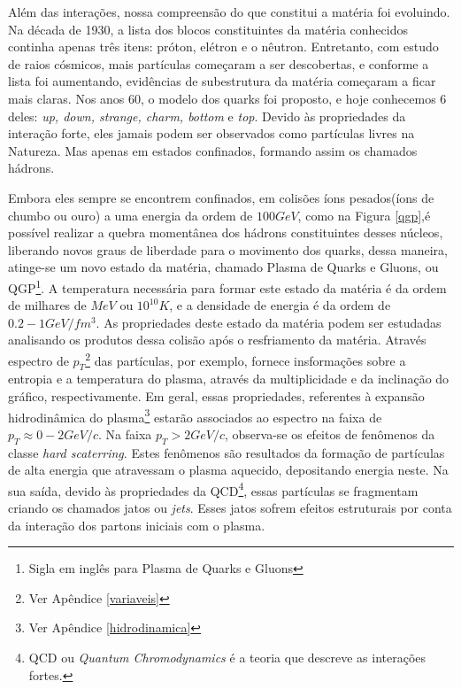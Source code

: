 Além das interações, nossa compreensão do que constitui a matéria foi evoluindo. Na década de 1930, a lista dos blocos
constituintes da matéria conhecidos continha apenas três itens: próton, elétron e o nêutron. Entretanto, com estudo de raios
cósmicos, mais partículas começaram a ser descobertas, e conforme a lista foi aumentando, evidências de subestrutura da matéria
começaram a ficar mais claras. Nos anos 60, o modelo dos quarks foi proposto, e hoje conhecemos 6 deles: {\it up, down, strange,
charm, bottom} e {\it top}. Devido às propriedades da interação forte, eles jamais podem ser observados como partículas livres na
Natureza. Mas apenas em estados confinados, formando assim os chamados hádrons.
\par
Embora eles sempre se encontrem confinados, em colisões íons pesados(íons de chumbo ou ouro) a uma energia da ordem de $100 GeV$,
como na Figura \ref{qgp},é possível realizar a quebra momentânea dos hádrons constituintes desses núcleos, liberando novos graus
de liberdade para o movimento dos quarks, dessa maneira, atinge-se um novo estado da matéria, chamado Plasma de Quarks e Gluons,
ou QGP\footnote{Sigla em inglês para Plasma de Quarks e Gluons}. A temperatura necessária para formar este estado da matéria é da
ordem de milhares de $MeV$ ou $10^{10} K$, e a densidade de energia é da ordem de $0.2-1 GeV/fm^{3}$. As propriedades deste estado
da matéria podem ser estudadas analisando os produtos dessa colisão após o resfriamento da matéria. Através espectro de
$p_T$\footnote{Ver Apêndice \ref{variaveis}} das partículas, por exemplo, fornece insformações sobre a entropia e a temperatura do
plasma, através da multiplicidade e da inclinação do gráfico, respectivamente. Em geral, essas propriedades, referentes à expansão
hidrodinâmica do plasma\footnote{Ver Apêndice \ref{hidrodinamica}} estarão associados ao espectro na faixa de $p_T \approx 0-2 GeV/c$.
Na faixa $p_T > 2 GeV/c$, observa-se os efeitos de fenômenos da classe {\it hard scaterring}. Estes fenômenos são resultados da formação
de partículas de alta energia que atravessam o plasma aquecido, depositando energia neste. Na sua saída, devido às propriedades da
QCD\footnote{QCD ou {\it Quantum Chromodynamics} é a teoria que descreve as interações fortes.}, essas partículas se fragmentam criando
os chamados jatos ou {\it jets}. Esses jatos sofrem efeitos estruturais por conta da interação dos partons
iniciais\cite{lokhtin_angular_1998,bass_systematic_2009,connors_review_2017,nattrass_jet_2018,denterria_jet_2009} com o plasma.

